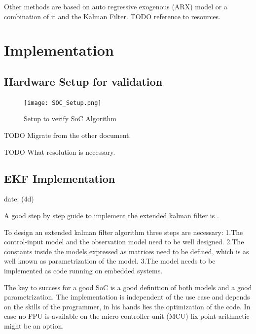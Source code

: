 Other methods are based on auto regressive exogenous (ARX) model or a combination of it and the Kalman Filter. TODO reference to resources.

\chapter{Implementation}

\section{Hardware Setup for validation}

\begin{figure}[h!]
\texttt{[image: SOC\_Setup.png]}
\caption{\label{fig:SoCSetup} Setup to verify SoC Algorithm}
\end{figure}



TODO Migrate from the other document.

TODO What resolution is necessary. 

\section{EKF Implementation}
date: (4d)

A good step by step guide to implement the extended kalman filter is \cite{rzepka2021implementing}.

To design an extended kalman filter algorithm three steps are necessary:
1.The control-input model and the observation model need to be well designed. 
2.The constants inside the models expressed as matrices need to be defined, which is as well known as parametrization of the model.  
3.The model needs to be implemented as code running on embedded systems. 

The key to success for a good SoC is a good definition of both models and a good parametrization. The implementation is independent of the use case and depends on the skills of the programmer, in his  hands lies the optimization of the  code. In case no FPU is available on the micro-controller unit (MCU) fix point arithmetic might be an option.  


